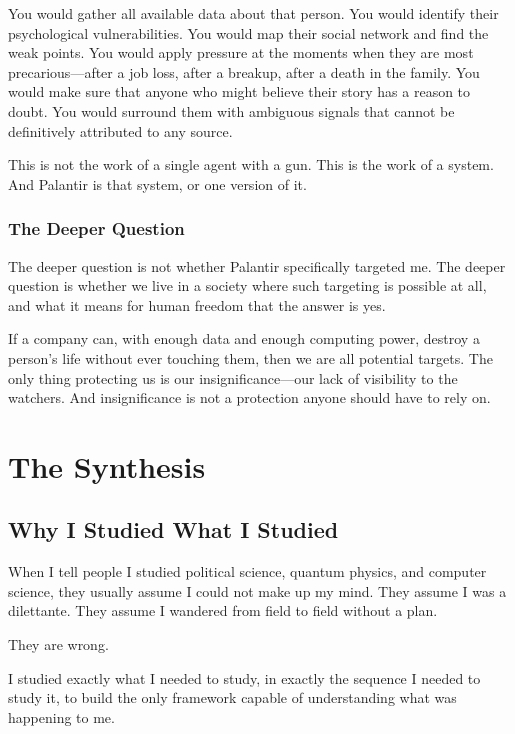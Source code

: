 \documentclass[11pt,openany]{book}
\begin{document}
You would gather all available data about that person. You would identify their psychological vulnerabilities. You would map their social network and find the weak points. You would apply pressure at the moments when they are most precarious---after a job loss, after a breakup, after a death in the family. You would make sure that anyone who might believe their story has a reason to doubt. You would surround them with ambiguous signals that cannot be definitively attributed to any source.

This is not the work of a single agent with a gun. This is the work of a system. And Palantir is that system, or one version of it.

\section*{The Deeper Question}

The deeper question is not whether Palantir specifically targeted me. The deeper question is whether we live in a society where such targeting is possible at all, and what it means for human freedom that the answer is yes.

If a company can, with enough data and enough computing power, destroy a person's life without ever touching them, then we are all potential targets. The only thing protecting us is our insignificance---our lack of visibility to the watchers. And insignificance is not a protection anyone should have to rely on.


\part{The Synthesis}

\chapter{Why I Studied What I Studied}

When I tell people I studied political science, quantum physics, and computer science, they usually assume I could not make up my mind. They assume I was a dilettante. They assume I wandered from field to field without a plan.

They are wrong.

I studied exactly what I needed to study, in exactly the sequence I needed to study it, to build the only framework capable of understanding what was happening to me.
\end{document}
